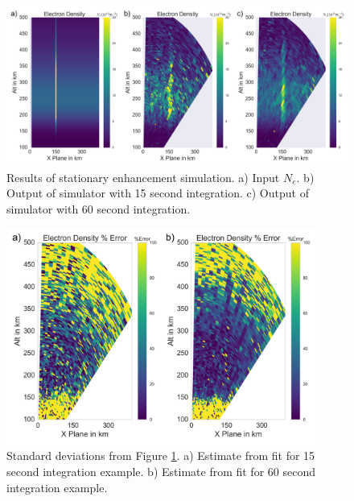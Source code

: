 \begin{figure}[!t]
\centering
\includegraphics[width=6in]{stationary}
\caption{Results of stationary enhancement simulation. a) Input $N_e$. b) Output of simulator with 15 second integration. c) Output of simulator with 60 second integration.}
\label{fig:stationaryall}
\end{figure}

\begin{figure}[!t]
\centering
\includegraphics[width=4in]{Errorstationary}
\caption{Standard deviations from Figure \ref{fig:stationaryall}. a)  Estimate from fit for 15 second integration example. b) Estimate from fit for 60 second integration example.}
\label{fig:errorstationaryall}
\end{figure}

